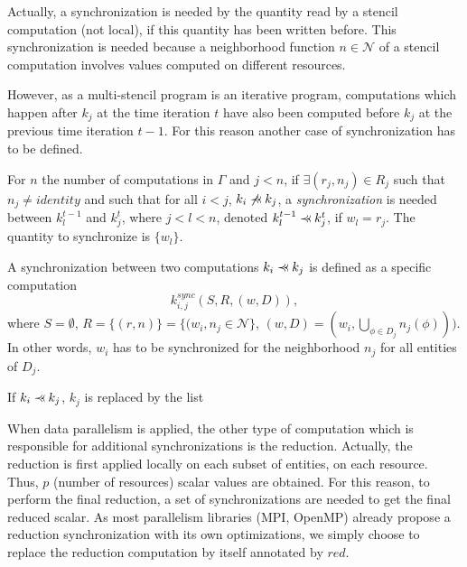 Actually, a synchronization is needed by the quantity read by a stencil computation (not local), if this quantity has been written before. This synchronization is needed because a neighborhood function $n \in \mathcal{N}$ of a stencil computation involves values computed on different resources.

However, as a multi-stencil program is an iterative program, computations which happen after $k_j$ at the time iteration $t$ have also been computed before $k_j$ at the previous time iteration $t-1$. For this reason another case of synchronization has to be defined.

\begin{mydef}
For $n$ the number of computations in $\Gamma$ and $j<n$, if $\exists (r_j,n_j) \in R_j$ such that $n_j\neq identity$ and such that for all $i<j$, $k_i \not \pprec k_j$, a \textit{synchronization} is needed between $k_l^{t-1}$ and $k_j^t$, where $j<l<n$, denoted $k_l^{t-1} \pprec k_j^{t}$, if $w_l=r_j$. The quantity to synchronize is $\{w_l\}$.
\label{def:sync2}
\end{mydef}

\begin{mydef}
A synchronization between two computations $k_i \pprec k_j$ is defined as a specific computation 
\begin{equation*}
k_{i,j}^{sync}(S,R,(w,D)), 
\end{equation*}
where $S=\emptyset$, $R=\{(r,n)\}=\{(w_i,n_j \in \mathcal{N}\}$, $(w,D)=(w_i,\bigcup_{\phi \in D_j} n_j(\phi)))$. In other words, $w_i$ has to be synchronized for the neighborhood $n_j$ for all entities of $D_j$.
\label{def:sync3}
\end{mydef}

\begin{mydef}
If $k_i \pprec k_j$, $k_j$ is replaced by the list
\begin{equation*}
[k_{i,j}^{sync}, k_j]
\end{equation*}
\end{mydef}

When data parallelism is applied, the other type of computation which is responsible for additional synchronizations is the reduction. Actually, the reduction is first applied locally on each subset of entities, on each resource. Thus, $p$ (number of resources) scalar values are obtained. For this reason, to perform the final reduction, a set of synchronizations are needed to get the final reduced scalar. As most parallelism libraries (MPI, OpenMP) already propose a reduction synchronization with its own optimizations, we simply choose to replace the reduction computation by itself annotated by $red$.

